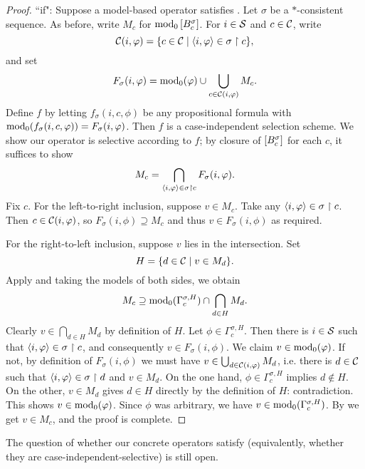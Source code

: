 \begin{proof}
    ``if": Suppose a model-based operator satisfies \hboundedness{}. Let
    $\sigma$ be a $\ast$-consistent sequence. As before, write $M_c$ for
    $\propmods\proppart{B^\sigma_c}$. For $i \in \S$ and $c \in \C$,
    write
    \[
        \C(i, \phi) = \{c \in \C \mid \tuple{i, \phi} \in \sigma \rs c\},
    \]
    and set
    \[
        F_\sigma(i, \phi)
        = \propmods(\phi) \cup \bigcup_{c \in \C(i, \phi)}{M_c}.
    \]
    Define $f$ by letting $f_\sigma(i, c, \phi)$ be any propositional formula
    with $\propmods(f_\sigma(i, c, \phi)) = F_\sigma(i, \phi)$. Then $f$ is a
    case-independent selection scheme. We show our operator is selective
    according to $f$; by closure of $\proppart{B^\sigma_c}$ for each $c$, it
    suffices to show
    \[
        M_c = \bigcap_{\tuple{i, \phi} \in \sigma \rs c}{F_\sigma(i, \phi)}.
    \]
    Fix $c$. For the left-to-right inclusion, suppose $v \in M_c$. Take any
    $\tuple{i, \phi} \in \sigma \rs c$. Then $c \in \C(i, \phi)$, so
    $F_\sigma(i, \phi) \supseteq M_c$ and thus $v \in F_\sigma(i, \phi)$ as
    required.

    For the right-to-left inclusion, suppose $v$ lies in the intersection. Set
    \[
        H = \{d \in \C \mid v \in M_d\}.
    \]
    Apply \hboundedness{} and taking the models of both sides, we obtain
    \begin{equation}
        \label{eqn:hbnd_application}
        M_c
        \supseteq
        \propmods(\Gamma^{\sigma, H}_c) \cap \bigcap_{d \in H}{M_d}.
    \end{equation}
    Clearly $v \in \bigcap_{d \in H}{M_d}$ by definition of $H$. Let $\phi \in
    \Gamma^{\sigma, H}_c$. Then there is $i \in \S$ such that
    $\tuple{i, \phi} \in \sigma \rs c$, and consequently $v \in F_\sigma(i,
    \phi)$. We claim $v \in \propmods(\phi)$. If not, by definition of
    $F_\sigma(i, \phi)$ we must have $v \in \bigcup_{d \in \C(i, \phi)}{M_d}$,
    i.e. there is $d \in \C$ such that $\tuple{i, \phi} \in \sigma \rs d$ and
    $v \in M_d$. On the one hand, $\phi \in \Gamma^{\sigma, H}_c$ implies $d
    \notin H$. On the other, $v \in M_d$ gives $d \in H$ directly by the
    definition of $H$: contradiction. This shows $v \in \propmods(\phi)$. Since
    $\phi$ was arbitrary, we have $v \in \propmods(\Gamma^{\sigma, H}_c)$. By
     we get $v \in M_c$, and the proof is
    complete.

\end{proof}

The question of whether our concrete operators satisfy \hboundedness{}
(equivalently, whether they are case-independent-selective) is still open.

